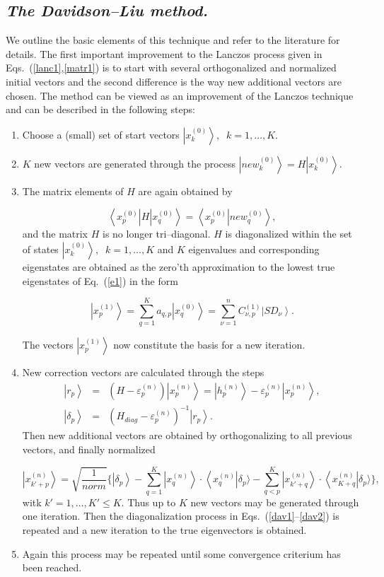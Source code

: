 \documentclass[twoside,12pt]{article}
\newcommand{\be}{\begin{equation}}
\newcommand{\ee}{\end{equation}}
\newcommand{\bra}[1]{\left\langle #1 \right|}
\newcommand{\ket}[1]{\left| #1 \right\rangle}
\begin{document}
\subsection{\it The Davidson--Liu method.}
%
We outline the basic elements of this technique and refer to
the literature \cite{dav89} for details.
The first important improvement to the Lanczos process given in
Eqs.~(\ref{lanc1},\ref{matr1}) is to start with
several orthogonalized  and normalized initial vectors
and the second difference is the  way new additional vectors
are chosen. The method can be viewed
as an improvement of the Lanczos technique and can be described
in the following steps:
%
\begin{enumerate}
%
\item Choose a (small) set  of start vectors
$\ket{x_k^{(0)}},\;\; k = 1,\ldots, K$.
%
\item $K$ new vectors are generated through the process
$\ket{new_k^{(0)}} = H \ket{x_k^{(0)}}$.
%
\item The matrix elements of $H$ are again obtained by

%
\be
\bra{x_p^{(0)}} H \ket{x_q^{(0)}}
= \bra{x_p^{(0)}} \left . new_q^{(0)}\right \rangle,
\label{dav1}
\ee
%
and the matrix $H$ is no longer tri--diagonal.
$H$ is diagonalized within the set of states
$\ket{x_k^{(0)}},\;\; k = 1, \ldots, K$
and $K$ eigenvalues and corresponding eigenstates are obtained
as the zero'th approximation to the lowest true eigenstates
of Eq.~(\ref{e1}) in the form
%

\be
\ket{x_p^{(1)}} = \sum_{q = 1}^{K} a_{q, p} \ket{x_q^{(0)}}
                = \sum_{\nu = 1}^{n} C_{\nu,p}^{(1)} \ket{SD_{\nu}}.
\label{dav2}
\ee

%
The vectors $\ket{x_p^{(1)}}$ now constitute the basis for a new iteration.
%
\item New correction vectors are calculated through the steps
%
%
\begin{eqnarray}
\ket{r_p} &=&(H - \varepsilon_p^{(n)}) \ket{x_p^{(n)}}
	 =\ket{h_p^{(n)}} - \varepsilon_p^{(n)} \ket{x_p^{(n)}},
			                       \nonumber\\
\ket{\delta_p} &=& (H_{diag}-\varepsilon_p^{(n)})^{-1} \ket{r_p}.
\label{dav3}
\end{eqnarray}
%
Then new additional vectors are obtained by orthogonalizing
to all previous vectors, and finally normalized
%

\be
\ket{x_{k'+p}^{(n)}}
	= \sqrt{\frac{1}{norm}} \{ \ket{\delta_p}
		  -\sum_{q=1}^K \ket{x_q^{(n)}} \cdot
	                    \bra{x_q^{(n)}} \delta_p \rangle 
  -\sum_{q<p}^K \ket{x_{k'+q}^{(n)}} \cdot \bra{x_{K+q}^{(n)}}
		                  \delta_p \rangle  \},
\ee
%
witk $k' = 1, \ldots, K' \leq K$. Thus up to $K$ new vectors
may be generated through one iteration.
Then the diagonalization process in Eqs.~(\ref{dav1}--\ref{dav2}) is
repeated and a new iteration to the true eigenvectors is obtained.
%
\item Again this process may be repeated until some convergence
criterium has been reached.
%
\end{enumerate}
%
\end{document}
